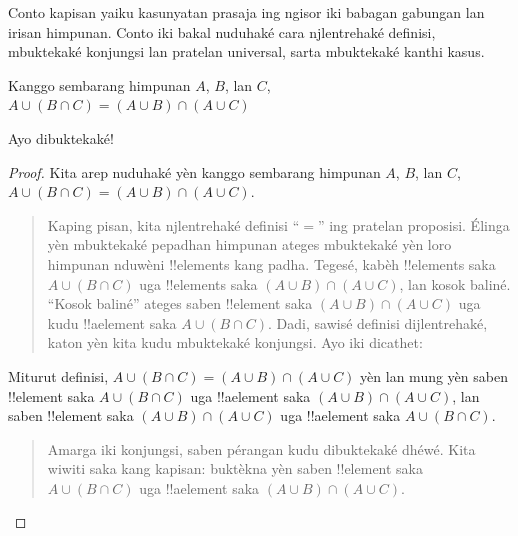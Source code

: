 \documentclass[../../../include/open-logic-section]{subfiles}
\begin{document}


Conto kapisan yaiku kasunyatan prasaja ing ngisor iki babagan
gabungan lan irisan himpunan. Conto iki bakal nuduhaké cara
njlentrehaké definisi, mbuktekaké konjungsi lan pratelan
universal, sarta mbuktekaké kanthi kasus.

\begin{prop}
Kanggo sembarang himpunan $A$, $B$, lan $C$, $A \cup (B \cap C) = (A \cup B)
\cap (A \cup C)$
\end{prop}

Ayo dibuktekaké!{}

\begin{proof}
Kita arep nuduhaké yèn kanggo sembarang himpunan $A$, $B$, lan $C$,
$A \cup (B \cap C) = (A \cup B) \cap (A \cup C)$.
\begin{quote}
Kaping pisan, kita njlentrehaké definisi ``$=$'' ing pratelan
proposisi. Élinga yèn mbuktekaké pepadhan himpunan ateges
mbuktekaké yèn loro himpunan nduwèni !!{element}s kang padha.
Tegesé, kabèh !!{element}s saka $A \cup (B \cap C)$ uga
!!{element}s saka $(A \cup B) \cap (A \cup C)$, lan kosok baliné.
``Kosok baliné'' ateges saben !!{element} saka $(A \cup B)
\cap (A \cup C)$ uga kudu !!a{element} saka $A \cup (B \cap
C)$. Dadi, sawisé definisi dijlentrehaké, katon yèn kita
kudu mbuktekaké konjungsi. Ayo iki dicathet:
\end{quote}
Miturut definisi, $A \cup (B \cap C) = (A \cup B) \cap (A \cup C)$
yèn lan mung yèn saben !!{element} saka $A \cup (B \cap C)$
uga !!a{element} saka $(A \cup B) \cap (A \cup C)$, lan
saben !!{element} saka $(A \cup B) \cap (A \cup C)$ uga
!!a{element} saka $A \cup (B \cap C)$.
\begin{quote}
Amarga iki konjungsi, saben pérangan kudu dibuktekaké dhéwé.
Kita wiwiti saka kang kapisan: buktèkna yèn saben
!!{element} saka $A \cup (B \cap C)$ uga !!a{element}
saka $(A \cup B) \cap (A \cup C)$.


\end{quote}
\end{proof}
\end{document}
